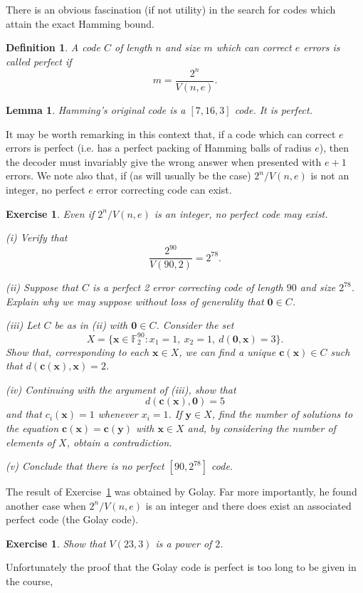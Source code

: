 \documentclass[12pt,a4paper]{article}
\theoremstyle{plain}
\newtheorem{lemma}[theorem]{Lemma}
\newtheorem{definition}[theorem]{Definition}
\newtheorem{exercise}[theorem]{Exercise}
\theoremstyle{definition}
\begin{document}
There is an obvious fascination (if not utility)
in the search for codes which attain the
exact Hamming bound.
\begin{definition} A code $C$ of length $n$
and size $m$ which can correct $e$ errors
is called \emph{perfect} if
\[m=\frac{2^{n}}{V(n,e)}.\]
\end{definition}
\begin{lemma} Hamming's original code is
a $[7,16,3]$ code. It is perfect.
\end{lemma}
It may be worth remarking in this context
that, if a code which can correct $e$ errors
is perfect (i.e. has a perfect packing
of Hamming balls of radius $e$),
then the decoder must invariably
give the wrong answer when presented with
$e+1$ errors. We note also that,
if (as will usually be the case)
$2^{n}/V(n,e)$ is not an integer, no
perfect $e$ error correcting code can exist.


\begin{exercise}\label{Not perfect}
Even if $2^{n}/V(n,e)$ is an integer,
no perfect code may exist.

(i) Verify that
\[\frac{2^{90}}{V(90,2)}=2^{78}.\]

(ii) Suppose that $C$ is a perfect 2 error correcting
code of length $90$ and size $2^{78}$. Explain
why we may suppose without loss of generality
that ${\boldsymbol 0}\in C$.

(iii) Let $C$ be as in (ii) with ${\boldsymbol 0}\in C$.
Consider the set
\[X=\{{\mathbf x}\in{\mathbb F}_{2}^{90}:
x_{1}=1,\ x_{2}=1,\ d({\boldsymbol 0},{\mathbf x})=3\}.\]
Show that, corresponding to each ${\mathbf x}\in X$,
we can find a unique ${\mathbf c}({\mathbf x})\in C$
such that $d({\mathbf c}({\mathbf x}),{\mathbf x})=2$.

(iv) Continuing with the argument of (iii), show
that
\[d({\mathbf c}({\mathbf x}),{\boldsymbol 0})=5\]
and that $c_{i}({\mathbf x})=1$ whenever $x_{i}=1$.
If  $\mathbf{y}\in X$,
find the number of solutions to the equation
${\mathbf c}({\mathbf x})={\mathbf c}({\mathbf y})$
with $\mathbf{x}\in X$
and, by considering the number of elements of $X$,
obtain a contradiction.

(v) Conclude that there is no perfect $[90,2^{78}]$ code.
\end{exercise}
The  result of Exercise~\ref{Not perfect} was obtained by
Golay. Far more importantly, he found another case
when $2^{n}/V(n,e)$ is an integer and there
does exist an associated perfect code (the Golay code).
\begin{exercise}\label{Golay perfect}
Show that $V(23,3)$ is a power of $2$.
\end{exercise}
Unfortunately the proof that the Golay code is perfect is
too long to be given in the course,
\end{document}
